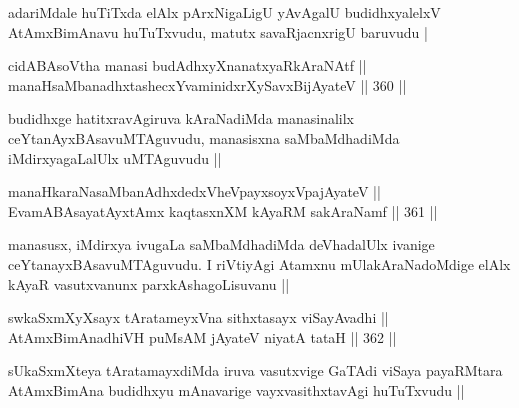 \begin{artha}
adariMdale huTiTxda elAlx pArxNigaLigU yAvAgalU budidhxyalelxV AtAmxBimAnavu huTuTxvudu, matutx savaRjacnxrigU baruvudu |
\end{artha}

\begin{shl}
cidABAsoV\s tha manasi budAdhxyXnanatxyaRkAraNAtf || \\
manaHsaMbanadhxtashecxYvaminidxrXySavxBijAyateV ||  360 ||  
\end{shl}

\begin{artha}
budidhxge hatitxravAgiruva kAraNadiMda manasinalilx ceYtanAyxBAsavuMTAguvudu, manasisxna saMbaMdhadiMda iMdirxyagaLalUlx uMTAguvudu ||
\end{artha}

\begin{shl}
manaHkaraNasaMbanAdhxdedxVheV\s payxsoyxVpajAyateV || \\
EvamABAsayatAyxtAmx kaqtasxnXM kAyaRM sakAraNamf ||  361 ||  
\end{shl}

\begin{artha}
manasusx, iMdirxya ivugaLa saMbaMdhadiMda deVhadalUlx ivanige ceYtanayxBAsavuMTAguvudu. I riVtiyAgi Atamxnu mUlakAraNadoMdige elAlx kAyaR vasutxvanunx parxkAshagoLisuvanu ||
\end{artha}

\begin{shl}
swkaSxmXyXsayx tAratameyxVna sithxtasayx viSayAvadhi || \\
AtAmxBimAnadhiVH puMsAM jAyateV niyatA tataH ||  362 ||  
\end{shl}

\begin{artha}
sUkaSxmXteya tAratamayxdiMda iruva vasutxvige GaTAdi viSaya payaRMtara AtAmxBimAna budidhxyu mAnavarige vayxvasithxtavAgi huTuTxvudu ||
\end{artha}
